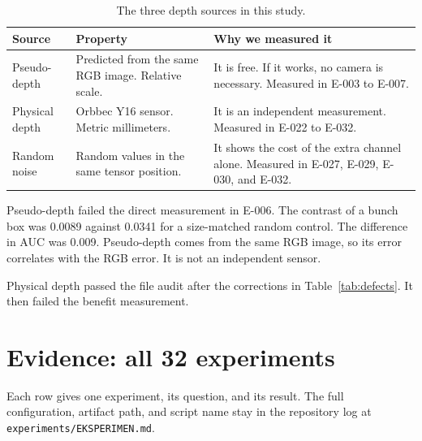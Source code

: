 \documentclass[preprint,12pt]{elsarticle}
\newcommand{\E}[1]{E-#1}
\begin{document}
\begin{table}[H]
\centering
\caption{The three depth sources in this study.}
\label{tab:depthkinds}
\begin{tabularx}{\columnwidth}{L{0.22\columnwidth}L{0.24\columnwidth}Y}
\toprule
\textbf{Source} & \textbf{Property} & \textbf{Why we measured it}\\
\midrule
Pseudo-depth & Predicted from the same RGB image. Relative scale. & It is free.
If it works, no camera is necessary. Measured in \E{003} to \E{007}.\\
Physical depth & Orbbec Y16 sensor. Metric millimeters. & It is an independent
measurement. Measured in \E{022} to \E{032}.\\
Random noise & Random values in the same tensor position. & It shows the cost
of the extra channel alone. Measured in \E{027}, \E{029}, \E{030}, and
\E{032}.\\
\bottomrule
\end{tabularx}
\end{table}

Pseudo-depth failed the direct measurement in \E{006}. The contrast of a bunch
box was 0.0089 against 0.0341 for a size-matched random control. The difference
in AUC was 0.009. Pseudo-depth comes from the same RGB image, so its error
correlates with the RGB error. It is not an independent sensor.

Physical depth passed the file audit after the corrections in
Table~\ref{tab:defects}. It then failed the benefit measurement.

\section{Evidence: all 32 experiments}
\label{sec:experiments}

Each row gives one experiment, its question, and its result. The full
configuration, artifact path, and script name stay in the repository log at
\texttt{experiments/EKSPERIMEN.md}.
\end{document}
